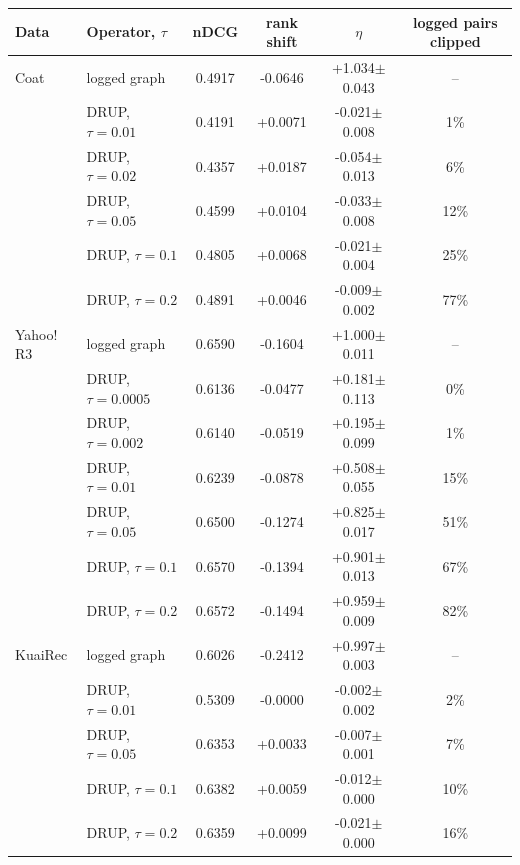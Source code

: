 \begin{tabular}{llcccc}
\toprule
Data & Operator, $\tau$ & nDCG & rank shift & $\eta$ & logged pairs clipped\\
\midrule
Coat & logged graph & 0.4917 & -0.0646 & +1.034$\pm$0.043 & --\\
 & DRUP, $\tau=0.01$ & 0.4191 & +0.0071 & -0.021$\pm$0.008 & 1\%\\
 & DRUP, $\tau=0.02$ & 0.4357 & +0.0187 & -0.054$\pm$0.013 & 6\%\\
 & DRUP, $\tau=0.05$ & 0.4599 & +0.0104 & -0.033$\pm$0.008 & 12\%\\
 & DRUP, $\tau=0.1$ & 0.4805 & +0.0068 & -0.021$\pm$0.004 & 25\%\\
 & DRUP, $\tau=0.2$ & 0.4891 & +0.0046 & -0.009$\pm$0.002 & 77\%\\
\midrule
Yahoo!\,R3 & logged graph & 0.6590 & -0.1604 & +1.000$\pm$0.011 & --\\
 & DRUP, $\tau=0.0005$ & 0.6136 & -0.0477 & +0.181$\pm$0.113 & 0\%\\
 & DRUP, $\tau=0.002$ & 0.6140 & -0.0519 & +0.195$\pm$0.099 & 1\%\\
 & DRUP, $\tau=0.01$ & 0.6239 & -0.0878 & +0.508$\pm$0.055 & 15\%\\
 & DRUP, $\tau=0.05$ & 0.6500 & -0.1274 & +0.825$\pm$0.017 & 51\%\\
 & DRUP, $\tau=0.1$ & 0.6570 & -0.1394 & +0.901$\pm$0.013 & 67\%\\
 & DRUP, $\tau=0.2$ & 0.6572 & -0.1494 & +0.959$\pm$0.009 & 82\%\\
\midrule
KuaiRec & logged graph & 0.6026 & -0.2412 & +0.997$\pm$0.003 & --\\
 & DRUP, $\tau=0.01$ & 0.5309 & -0.0000 & -0.002$\pm$0.002 & 2\%\\
 & DRUP, $\tau=0.05$ & 0.6353 & +0.0033 & -0.007$\pm$0.001 & 7\%\\
 & DRUP, $\tau=0.1$ & 0.6382 & +0.0059 & -0.012$\pm$0.000 & 10\%\\
 & DRUP, $\tau=0.2$ & 0.6359 & +0.0099 & -0.021$\pm$0.000 & 16\%\\
\bottomrule
\end{tabular}
